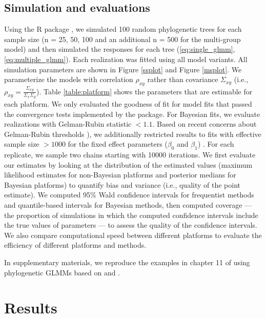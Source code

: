 \documentclass[12pt]{article}
\begin{document}
\subsection*{Simulation and evaluations}

Using the R package  \citep{ape}, we simulated 100 random phylogenetic trees  for each sample size (n = 25, 50, 100 and an additional n = 500 for the multi-group model) and then simulated the responses for each tree (\ref{eq:single_glmm}, \ref{eq:multiple_glmm}). 
Each realization was fitted using all model variants. 
All simulation parameters are shown in Figure \ref{ssplot} and Figure \ref{msplot}. 
We parameterize the models with correlation $\rho_{xy}$ rather than covariance $\Sigma_{xy}$ (i.e., $\rho_{xy} = \frac{\Sigma_{xy}}{\Sigma_{x}\Sigma_{y}}$).
Table \ref{table:platform} shows the parameters that are estimable for each platform. 
We only evaluated the goodness of fit for model fits that passed the convergence tests implemented by the package.
For Bayesian fits, we evaluate realizations with Gelman-Rubin statistic $<1.1$. Based on recent concerns about Gelman-Rubin thresholds \citep{vats2018revisiting}), we additionally restricted results to fits with  effective sample size $>1000$ for the fixed effect parameters ($\beta_{0}$ and $\beta_{1}$) \citep{vehtari2019rank}. 
For each replicate, we sample two chains starting with 10000 iterations. 
We first evaluate our estimates by looking at the distribution of the estimated values (maximum likelihood estimates for non-Bayesian platforms and posterior medians for Bayesian platforms) to quantify bias and variance (i.e., quality of the point estimate).
We computed 95\% Wald confidence intervals for frequentist methods and quantile-based intervals for Bayesian methods, then computed coverage --- the proportion of simulations in which the computed confidence intervals include the true values of parameters --- to assess the quality of the confidence intervals.  
We also compare computational speed between different platforms to evaluate the efficiency of different platforms and methods. 

In supplementary materials, we reproduce the examples in chapter 11 of \cite{garamszegi2014modern} using phylogenetic GLMMs based on  and .

\section*{Results}
\end{document}
